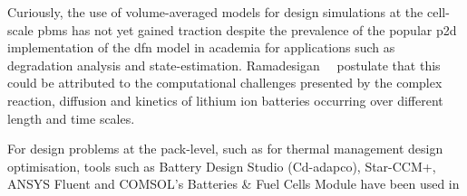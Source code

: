 Curiously,  the use  of volume-averaged  models  for design  simulations at  the
cell-scale \glspl{pbm}  has not  yet gained traction  despite the  prevalence of
the  popular  \gls{p2d}  implementation  of  the  \gls{dfn}  model  in  academia
for   applications   such   as  degradation   analysis   and   state-estimation.
Ramadesigan~\etal~\cite{Ramadesigan2012} postulate that this could be attributed
to the computational challenges presented by the complex reaction, diffusion and
kinetics  of lithium  ion batteries  occurring  over different  length and  time
scales.

For design  problems at the  pack-level, such  as for thermal  management design
optimisation, tools such as Battery  Design Studio (Cd-adapco), Star-CCM+, ANSYS
Fluent and COMSOL's Batteries \& Fuel Cells Module have been used in




